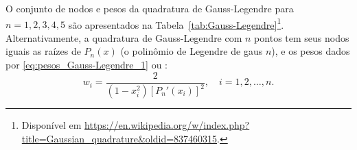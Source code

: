 \begin{obs}\label{obs:quad_Gauss-Legendre}
  O conjunto de nodos e pesos da quadratura de Gauss-Legendre para $n=1, 2, 3, 4, 5$ são apresentados na Tabela~\ref{tab:Gauss-Legendre}\footnote{Disponível em \url{https://en.wikipedia.org/w/index.php?title=Gaussian_quadrature&oldid=837460315}.}. Alternativamente, a quadratura de Gauss-Legendre com $n$ pontos tem seus nodos iguais as raízes de $P_n(x)$ (o polinômio de Legendre de gaus $n$), e os pesos dados por \eqref{eq:pesos_Gauss-Legendre_1} ou \cite[Cap.4, Sec. 4.6]{Press2007a}:
  \begin{equation}
    w_i = \frac{2}{(1-x_i^2)\left[P_n'(x_i)\right]^2},\quad i=1, 2, \dotsc, n.
  \end{equation}
\end{obs}

